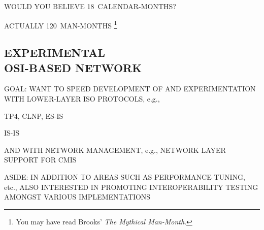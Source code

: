\begin{bwslide}

\begin{nrtc}
\item	WOULD YOU BELIEVE 18~CALENDAR-MONTHS?

\item	ACTUALLY 120~MAN-MONTHS%
	\footnote{You may have read Brooks' {\em The Mythical Man-Month}.}
\end{nrtc}
\end{bwslide}


\begin{bwslide}
\part	{EXPERIMENTAL\\ OSI-BASED NETWORK}
\end{bwslide}


\begin{bwslide}

\begin{nrtc}
\item	GOAL: WANT TO SPEED DEVELOPMENT OF AND EXPERIMENTATION WITH
	LOWER-LAYER ISO PROTOCOLS, e.g.,
    \begin{nrtc}
    \item	TP4, CLNP, ES-IS

    \item	IS-IS
    \end{nrtc}

\item	AND WITH NETWORK MANAGEMENT, e.g., NETWORK LAYER SUPPORT FOR CMIS


\item	ASIDE: IN ADDITION TO AREAS SUCH AS PERFORMANCE TUNING, etc.,
	ALSO INTERESTED IN PROMOTING INTEROPERABILITY TESTING AMONGST
	VARIOUS IMPLEMENTATIONS
\end{nrtc}
\end{bwslide}


